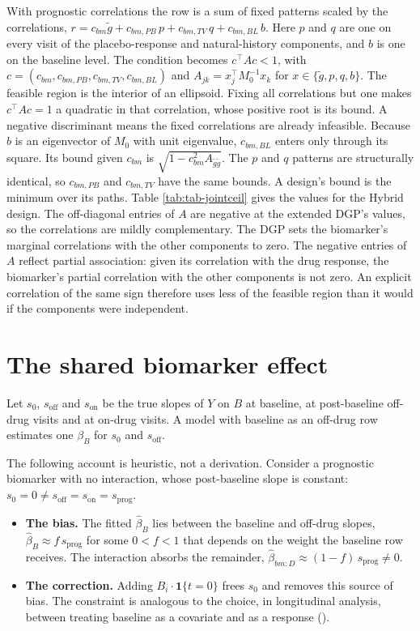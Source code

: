 \documentclass[
  11pt,
]{article}
\providecommand{\tightlist}{%
  \setlength{\itemsep}{0pt}\setlength{\parskip}{0pt}}
\begin{document}
With prognostic correlations the row is a sum of fixed patterns scaled
by the correlations,
\(r = c_{bm}\tilde g + c_{bm,PB}\, p + c_{bm,TV}\, q + c_{bm,BL}\, b\).
Here \(p\) and \(q\) are one on every visit of the placebo-response and
natural-history components, and \(b\) is one on the baseline level. The
condition becomes \(c^\top A c < 1\), with
\(c = (c_{bm}, c_{bm,PB}, c_{bm,TV}, c_{bm,BL})\) and
\(A_{jk} = x_j^\top M_0^{-1} x_k\) for \(x \in \{\tilde g, p, q, b\}\). The
feasible region is the interior of an ellipsoid. Fixing all
correlations but one makes \(c^\top A c = 1\) a quadratic in that
correlation, whose positive root is its bound. A negative discriminant
means the fixed correlations are already infeasible. Because \(b\) is an
eigenvector of \(M_0\) with unit eigenvalue, \(c_{bm,BL}\) enters only
through its square. Its bound given \(c_{bm}\) is
\(\sqrt{1 - c_{bm}^2 A_{\tilde g\tilde g}}\). The \(p\) and \(q\) patterns
are structurally identical, so \(c_{bm,PB}\) and \(c_{bm,TV}\) have the
same bounds. A design's bound is the minimum over its paths. Table
\ref{tab:tab-jointceil} gives the values for the Hybrid design. The
off-diagonal entries of \(A\) are negative at the extended DGP's values,
so the correlations are mildly complementary. The DGP sets the
biomarker's marginal correlations with the other components to zero.
The negative entries of \(A\) reflect partial association: given its
correlation with the drug response, the biomarker's partial
correlation with the other components is not zero. An explicit
correlation of the same sign therefore uses less of the feasible
region than it would if the components were independent.

\section{The shared biomarker effect}\label{sec-shared}

Let \(s_0\), \(s_{\text{off}}\) and \(s_{\text{on}}\) be the true slopes of
\(Y\) on \(B\) at baseline, at post-baseline off-drug visits and at
on-drug visits. A model with baseline as an off-drug row estimates one
\(\beta_B\) for \(s_0\) and \(s_{\text{off}}\).

The following account is heuristic, not a derivation. Consider a
prognostic biomarker with no interaction, whose post-baseline slope is
constant: \(s_0 = 0 \ne s_{\text{off}} = s_{\text{on}} = s_{\text{prog}}\).

\begin{itemize}
\tightlist
\item
  \textbf{The bias.} The fitted \(\hat\beta_B\) lies between the baseline and
  off-drug slopes, \(\hat\beta_B \approx f\,s_{\text{prog}}\) for some
  \(0 < f < 1\) that depends on the weight the baseline row receives.
  The interaction absorbs the remainder,
  \(\hat\beta_{bm:D} \approx (1 - f)\,s_{\text{prog}} \ne 0\).
\item
  \textbf{The correction.} Adding \(B_i\cdot\mathbf 1\{t = 0\}\) frees \(s_0\)
  and removes this source of bias. The constraint is analogous to the
  choice, in longitudinal analysis, between treating baseline as a
  covariate and as a response ().
\end{itemize}
\end{document}
